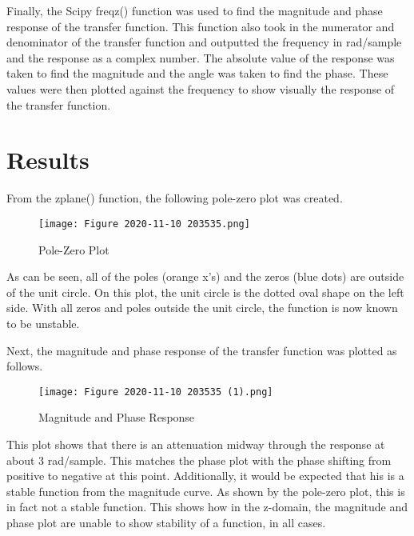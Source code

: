 \documentclass[12pt, titlepage]{article}
\begin{document}
    Finally, the Scipy freqz() function was used to find the magnitude and phase response of the transfer function.  This function also took in the numerator and denominator of the transfer function and outputted the frequency in rad/sample and the response as a complex number.  The absolute value of the response was taken to find the magnitude and the angle was taken to find the phase.  These values were then plotted against the frequency to show visually the response of the transfer function.
    
   
    \section{Results}
    
    From the zplane() function, the following pole-zero plot was created.
    
    \begin{figure}[h!]
        \centering
        \texttt{[image: Figure 2020-11-10 203535.png]}
        \caption{Pole-Zero Plot}
        \label{fig:my_label}
    \end{figure}
    
    As can be seen, all of the poles (orange x's) and the zeros (blue dots) are outside of the unit circle.  On this plot, the unit circle is the dotted oval shape on the left side.  With all zeros and poles outside the unit circle, the function is now known to be unstable.
    
    Next, the magnitude and phase response of the transfer function was plotted as follows.
    
    \begin{figure}[h!]
        \centering
        \texttt{[image: Figure 2020-11-10 203535 (1).png]}
        \caption{Magnitude and Phase Response}
        \label{fig:my_label}
    \end{figure}
    
    This plot shows that there is an attenuation midway through the response at about 3 rad/sample.  This matches the phase plot with the phase shifting from positive to negative at this point.  Additionally, it would be expected that his is a stable function from the magnitude curve.  As shown by the pole-zero plot, this is in fact not a stable function.  This shows how in the z-domain, the magnitude and phase plot are unable to show stability of a function, in all cases.
    
    \clearpage
\end{document}
